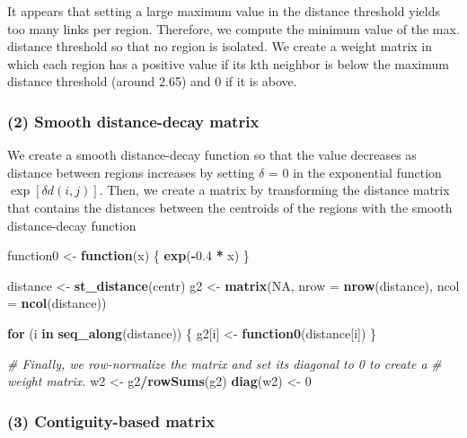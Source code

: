 \documentclass[
  a4paper,
]{article}
\newenvironment{Shaded}{\begin{snugshade}}{\end{snugshade}}
\newcommand{\AttributeTok}[1]{\textcolor[rgb]{0.13,0.29,0.53}{#1}}
\newcommand{\CommentTok}[1]{\textcolor[rgb]{0.56,0.35,0.01}{\textit{#1}}}
\newcommand{\ConstantTok}[1]{\textcolor[rgb]{0.56,0.35,0.01}{#1}}
\newcommand{\ControlFlowTok}[1]{\textcolor[rgb]{0.13,0.29,0.53}{\textbf{#1}}}
\newcommand{\DecValTok}[1]{\textcolor[rgb]{0.00,0.00,0.81}{#1}}
\newcommand{\FloatTok}[1]{\textcolor[rgb]{0.00,0.00,0.81}{#1}}
\newcommand{\FunctionTok}[1]{\textcolor[rgb]{0.13,0.29,0.53}{\textbf{#1}}}
\newcommand{\NormalTok}[1]{#1}
\newcommand{\OtherTok}[1]{\textcolor[rgb]{0.56,0.35,0.01}{#1}}
\newcommand{\SpecialCharTok}[1]{\textcolor[rgb]{0.81,0.36,0.00}{\textbf{#1}}}
\begin{document}
It appears that setting a large maximum value in the distance threshold
yields too many links per region. Therefore, we compute the minimum
value of the max. distance threshold so that no region is isolated. We
create a weight matrix in which each region has a positive value if its
kth neighbor is below the maximum distance threshold (around 2.65) and 0
if it is above.

\subsubsection{(2) Smooth distance-decay
matrix}\label{smooth-distance-decay-matrix}

We create a smooth distance-decay function so that the value decreases
as distance between regions increases by setting \(\delta\) = 0 in the
exponential function \(\exp[\delta d(i,j)]\). Then, we create a matrix
by transforming the distance matrix that contains the distances between
the centroids of the regions with the smooth distance-decay function

\begin{Shaded}
\begin{Highlighting}[]
\NormalTok{function0 }\OtherTok{\textless{}{-}} \ControlFlowTok{function}\NormalTok{(x) \{}
    \FunctionTok{exp}\NormalTok{(}\SpecialCharTok{{-}}\FloatTok{0.4} \SpecialCharTok{*}\NormalTok{ x)}
\NormalTok{\}}


\NormalTok{distance }\OtherTok{\textless{}{-}} \FunctionTok{st\_distance}\NormalTok{(centr)}
\NormalTok{g2 }\OtherTok{\textless{}{-}} \FunctionTok{matrix}\NormalTok{(}\ConstantTok{NA}\NormalTok{, }\AttributeTok{nrow =} \FunctionTok{nrow}\NormalTok{(distance), }\AttributeTok{ncol =} \FunctionTok{ncol}\NormalTok{(distance))}

\ControlFlowTok{for}\NormalTok{ (i }\ControlFlowTok{in} \FunctionTok{seq\_along}\NormalTok{(distance)) \{}
\NormalTok{    g2[i] }\OtherTok{\textless{}{-}} \FunctionTok{function0}\NormalTok{(distance[i])}
\NormalTok{\}}

\CommentTok{\# Finally, we row{-}normalize the matrix and set its diagonal to 0 to create a}
\CommentTok{\# weight matrix.}
\NormalTok{w2 }\OtherTok{\textless{}{-}}\NormalTok{ g2}\SpecialCharTok{/}\FunctionTok{rowSums}\NormalTok{(g2)}
\FunctionTok{diag}\NormalTok{(w2) }\OtherTok{\textless{}{-}} \DecValTok{0}
\end{Highlighting}
\end{Shaded}

\subsubsection{(3) Contiguity-based
matrix}\label{contiguity-based-matrix}
\end{document}

